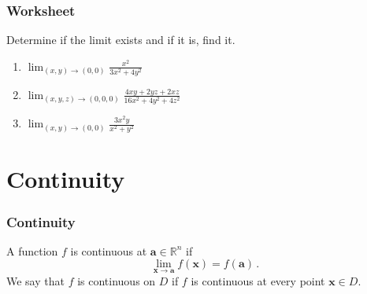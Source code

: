 \documentclass[aspectratio=169,handout]{beamer}
\newcommand{\vect}{\mathbf}
\newcommand{\R}{\mathbb{R}}
\begin{document}
\begin{frame}
    \frametitle{Worksheet}
    Determine if the limit exists and if it is, find it.
    \begin{enumerate}
        \item $\displaystyle \lim_{(x,y)\to (0,0)} \frac{x^2}{3x^2 + 4y^2}$
        \item $\displaystyle \lim_{(x, y, z) \rightarrow (0, 0, 0)} \frac{4 xy+ 2 yz+ 2 xz
}{16 x^2+ 4 y^2+ 4 z^2} $
    \item $\displaystyle \lim_{(x,y)\to(0,0)} \frac{3x^2y}{x^2 + y^2}$
    \end{enumerate}
\end{frame}

\section{Continuity}

\begin{frame}
    \frametitle{Continuity}
    A function $f$ is continuous at $\vect{a}\in \R^n$ if
    \begin{equation*}
        \lim_{\vect{x}\to \vect{a}} f(\vect{x}) = f(\vect{a}) \,.
    \end{equation*}
    We say that $f$ is continuous on $D$ if $f$ is continuous 
    at every point $\vect{x} \in D$.
\end{frame}
\end{document}
